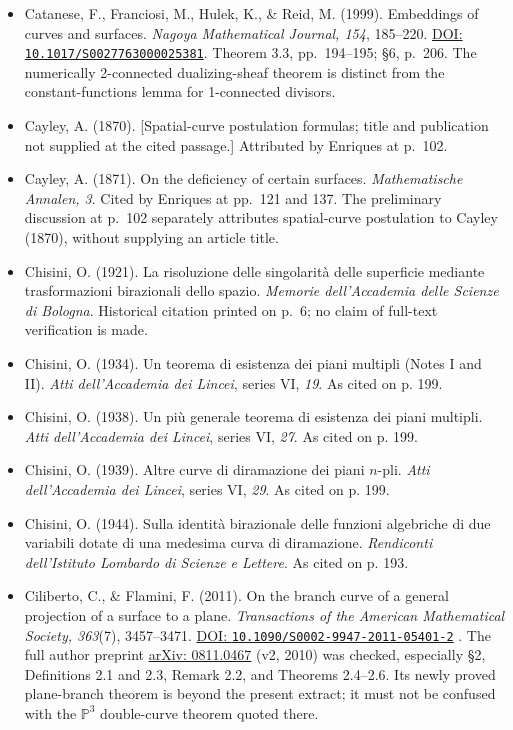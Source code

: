 \begin{sloppypar}
\begin{itemize}
\item Catanese, F., Franciosi, M., Hulek, K., \& Reid, M. (1999). Embeddings of curves and surfaces. \emph{Nagoya Mathematical Journal, 154}, 185--220. \href{https://doi.org/10.1017/S0027763000025381}{DOI: \nolinkurl{10.1017/S0027763000025381}}. Theorem 3.3, pp.~194--195; §6, p.~206. The numerically 2-connected dualizing-sheaf theorem is distinct from the constant-functions lemma for 1-connected divisors.

\item Cayley, A. (1870). {[}Spatial-curve postulation formulas; title and publication not supplied at the cited passage.{]} Attributed by Enriques at p.~102.

\item Cayley, A. (1871). On the deficiency of certain surfaces. \emph{Mathematische Annalen, 3}. Cited by Enriques at pp.~121 and 137. The preliminary discussion at p.~102 separately attributes spatial-curve postulation to Cayley (1870), without supplying an article title.

\item Chisini, O. (1921). La risoluzione delle singolarità delle superficie mediante trasformazioni birazionali dello spazio. \emph{Memorie dell'Accademia delle Scienze di Bologna}. Historical citation printed on p.~6; no claim of full-text verification is made.

\item Chisini, O. (1934). Un teorema di esistenza dei piani multipli (Notes I and II). \emph{Atti dell'Accademia dei Lincei}, series VI, \emph{19}. As cited on p. 199.

\item Chisini, O. (1938). Un pi\`u generale teorema di esistenza dei piani multipli. \emph{Atti dell'Accademia dei Lincei}, series VI, \emph{27}. As cited on p. 199.

\item Chisini, O. (1939). Altre curve di diramazione dei piani $n$-pli. \emph{Atti dell'Accademia dei Lincei}, series VI, \emph{29}. As cited on p. 199.

\item Chisini, O. (1944). Sulla identit\`a birazionale delle funzioni algebriche di due variabili dotate di una medesima curva di diramazione. \emph{Rendiconti dell'Istituto Lombardo di Scienze e Lettere}. As cited on p. 193.

\item Ciliberto, C., \& Flamini, F. (2011). On the branch curve of a general projection of a surface to a plane. \emph{Transactions of the American Mathematical Society, 363}(7), 3457--3471. \href{https://doi.org/10.1090/S0002-9947-2011-05401-2}{DOI: \nolinkurl{10.1090/S0002-9947-2011-05401-2}} . The full author preprint \href{https://arxiv.org/abs/0811.0467}{arXiv: 0811.0467} (v2, 2010) was checked, especially §2, Definitions 2.1 and 2.3, Remark 2.2, and Theorems 2.4--2.6. Its newly proved plane-branch theorem is beyond the present extract; it must not be confused with the \(\mathbb P^3\) double-curve theorem quoted there.


\end{itemize}
\end{sloppypar}
